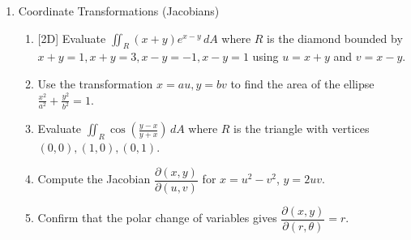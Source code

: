 \documentclass[12pt]{article}
\newcommand{\dimtag}[1]{{\footnotesize\textsc{[#1]}}\;}
\newcounter{topic}
\begin{document}
\begin{enumerate}
\begin{enumerate}
        \begin{enumerate}
            \item Write the bounds for $\rho$, $\phi$, and $\theta$ in spherical coordinates.
            \item Evaluate $\iiint_E z \, dV$.
        \end{enumerate}
        \item Use spherical coordinates to evaluate $\iiint_E (x^2 + y^2 + z^2) \, dV$ where $E$ is the solid in the first octant bounded by the sphere $x^2+y^2+z^2 = 9$ and the coordinate planes.
        \item (Stewart \S15.8 \#44) Evaluate by changing to spherical coordinates.
        \[ \int_{-a}^{a}\int_{-\sqrt{a^2-y^2}}^{\sqrt{a^2-y^2}}\int_{-\sqrt{a^2-x^2-y^2}}^{\sqrt{a^2-x^2-y^2}} (x^2 z + y^2 z + z^3)\, dz\,dx\,dy. \]
        \item Find the volume of a ball of radius $a$ using spherical coordinates.
    \end{enumerate}
\newpage

\item Coordinate Transformations (Jacobians)
    \begin{enumerate}
        \item \dimtag{2D} Evaluate $\iint_R (x+y) e^{x-y} \, dA$ where $R$ is the diamond bounded by $x+y=1, x+y=3, x-y=-1, x-y=1$ using $u=x+y$ and $v=x-y$.
        \item Use the transformation $x=au, y=bv$ to find the area of the ellipse $\frac{x^2}{a^2} + \frac{y^2}{b^2} = 1$.
        \item Evaluate $\iint_R \cos\left( \frac{y-x}{y+x} \right) \, dA$ where $R$ is the triangle with vertices $(0,0), (1,0), (0,1)$.
        \item Compute the Jacobian $\dfrac{\partial(x,y)}{\partial(u,v)}$ for $x=u^2-v^2$, $y=2uv$.
        \item Confirm that the polar change of variables gives $\dfrac{\partial(x,y)}{\partial(r,\theta)}=r$.
    \end{enumerate}
\newpage
\setcounter{topic}{\value{enumi}}
\end{enumerate}
\end{document}
